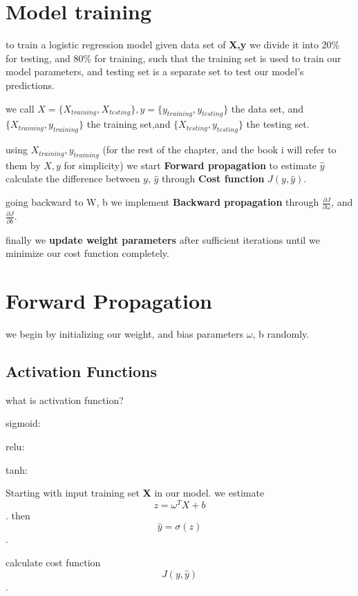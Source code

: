\documentclass[4apaper,12pt]{book}
\begin{document}
\section {Model training}
\begin {description}
\item to train a logistic regression model given data set of \textbf{{X,y}} we divide it into 20\% for testing, and 80\% for training, such that the training set is used to train our model parameters, and testing set is a separate set to test our model's predictions.

\item we call $X=\{X_{training},X_{testing}\}, y=\{y_{training},y_{testing}\}$ the data set, and
  $\{X_{training}, y_{training}\}$ the training set,and
  $\{X_{testing}, y_{testing}\}$ the testing set.
\item using $X_{training}, y_{training}$ (for the rest of the chapter, and the book i will refer to them by $X,y$ for simplicity) we start \textbf{Forward propagation} to estimate $\hat{y}$ calculate the difference between $y$, $\hat{y}$ through \textbf{Cost function} $J(y,\hat{y})$.
\item going backward to W, b we implement \textbf{Backward propagation} through $\frac{\partial{J}}{\partial{\omega}}$, and $\frac{\partial{J}}{\partial{b}}$.
\item finally we \textbf{update weight parameters} after sufficient iterations until we minimize our cost function completely.
\end {description}

\section{Forward Propagation}
\begin{description}
\item we begin by initializing our weight, and bias parameters
  $\omega$, b randomly.
  \subsection{Activation Functions}
  \item what is activation function?
\item sigmoid:
\item relu:
\item tanh:

\item Starting with input training set \textbf{X} in our model. we estimate
  $$z=\omega^TX + b$$. then $$\hat{y}=\sigma(z)$$.

\item calculate cost function $$J(y,\hat{y})$$.
\end{description}
\end{document}
